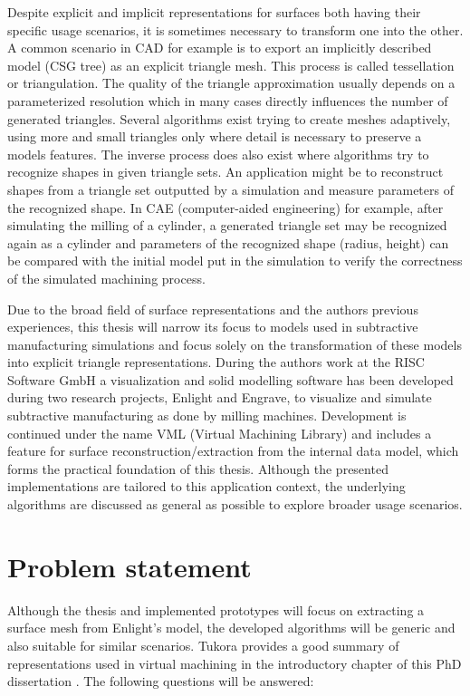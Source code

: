 Despite explicit and implicit representations for surfaces both having their specific usage scenarios, it is sometimes necessary to transform one into the other.
A common scenario in CAD for example is to export an implicitly described model (\eg CSG tree) as an explicit triangle mesh.
This process is called tessellation or triangulation.
The quality of the triangle approximation usually depends on a parameterized resolution which in many cases directly influences the number of generated triangles.
Several algorithms exist trying to create meshes adaptively, using more and small triangles only where detail is necessary to preserve a models features.
%
The inverse process does also exist where algorithms try to recognize shapes in given triangle sets.
An application might be to reconstruct shapes from a triangle set outputted by a simulation and measure parameters of the recognized shape.
In CAE (computer-aided engineering) for example, after simulating the milling of a cylinder, a generated triangle set may be recognized again as a cylinder and parameters of the recognized shape (\eg radius, height) can be compared with the initial model put in the simulation to verify the correctness of the simulated machining process.


Due to the broad field of surface representations and the authors previous experiences, this thesis will narrow its focus to models used in subtractive manufacturing simulations and focus solely on the transformation of these models into explicit triangle representations.
During the authors work at the RISC Software GmbH a visualization and solid modelling software has been developed during two research projects, Enlight and Engrave, to visualize and simulate subtractive manufacturing as done by milling machines.
Development is continued under the name VML (Virtual Machining Library) and includes a feature for surface reconstruction/extraction from the internal data model, which forms the practical foundation of this thesis.
Although the presented implementations are tailored to this application context, the underlying algorithms are discussed as general as possible to explore broader usage scenarios.


\section{Problem statement}


Although the thesis and implemented prototypes will focus on extracting a surface mesh from Enlight's model, the developed algorithms will be generic and also suitable for similar scenarios.
Tukora provides a good summary of representations used in virtual machining in the introductory chapter of this PhD dissertation \cite{virtual_machining_review}.
The following questions will be answered:

